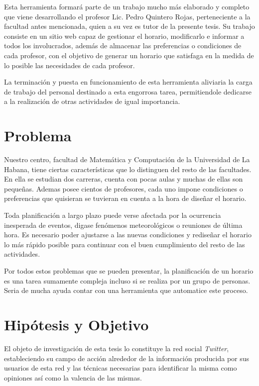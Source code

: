 \begin{introduction}
Esta herramienta formará parte de un trabajo mucho más elaborado y completo que viene desarrollando
el profesor Lic. Pedro Quintero Rojas, perteneciente a la facultad antes mencionada, quien a su vez
es tutor de la presente tesis. Su trabajo consiste en un sitio web capaz de gestionar el horario,
modificarlo e informar a todos los involucrados, además de almacenar las preferencias o condiciones
de cada profesor, con el objetivo de generar un horario que satisfaga en la medida de lo posible
las necesidades de cada profesor.

La terminación y puesta en funcionamiento de esta herramienta aliviaria la carga de trabajo del
personal destinado a esta engorrosa tarea, permitiendole dedicarse a la realización de otras
actividades de igual importancia.

\section*{Problema}

Nuestro centro, facultad de Matemática y Computación de la Universidad de La Habana, tiene ciertas
características que lo distinguen del resto de las facultades. En ella se estudian dos carreras,
cuenta con pocas aulas y muchas de ellas son pequeñas. Ademas posee cientos de profesores, cada uno
impone condiciones o preferencias que quisieran se tuvieran en cuenta a la hora de diseñar el horario.

Toda planificación a largo plazo puede verse afectada por la ocurrencia inesperada de eventos,
digase fenómenos meteorológicos o reuniones de última hora. Es necesario poder ajustarse a las nuevas
condiciones y rediseñar el horario lo más rápido posible para continuar con el buen cumplimiento del
resto de las actividades.

Por todos estos problemas que se pueden presentar, la planificación de un horario es una tarea sumamente compleja
incluso si se realiza por un grupo de personas. Seria de mucha ayuda contar con una herramienta
que automatice este proceso.


\section*{Hipótesis y Objetivo}

El objeto de investigación de esta tesis
lo constituye la red social \emph{Twitter},
estableciendo su campo de acción alrededor
de la información
producida por sus usuarios de esta red y las
técnicas necesarias para identificar la misma
como opiniones así como la valencia de las mismas.


\end{introduction}
